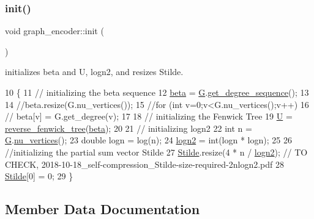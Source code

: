 \subsubsection{\texorpdfstring{init()}{init()}}
{\footnotesize\ttfamily void graph\+\_\+encoder\+::init (\begin{DoxyParamCaption}{ }\end{DoxyParamCaption})}



initializes beta and U, logn2, and resizes Stilde. 


\begin{DoxyCode}
10 \{
11   \textcolor{comment}{// initializing the beta sequence}
12   \hyperlink{classgraph__encoder_a40880adecfd63fb86e94b4b0fc3f6bc2}{beta} = \hyperlink{classgraph__encoder_a56d8ab1a423e192c6f80514ff5e5cfec}{G}.\hyperlink{classgraph_afdca627df7fb93a7d1d8a547f616e948}{get\_degree\_sequence}();
13 
14   \textcolor{comment}{//beta.resize(G.nu\_vertices());}
15   \textcolor{comment}{//for (int v=0;v<G.nu\_vertices();v++)}
16   \textcolor{comment}{//  beta[v] = G.get\_degree(v);  }
17 
18   \textcolor{comment}{// initializing the Fenwick Tree}
19   \hyperlink{classgraph__encoder_a3314c40920f2ee132958a6b0ce7e7995}{U} = \hyperlink{classreverse__fenwick__tree}{reverse\_fenwick\_tree}(\hyperlink{classgraph__encoder_a40880adecfd63fb86e94b4b0fc3f6bc2}{beta});
20 
21   \textcolor{comment}{// initializing logn2}
22   \textcolor{keywordtype}{int} n = \hyperlink{classgraph__encoder_a56d8ab1a423e192c6f80514ff5e5cfec}{G}.\hyperlink{classgraph_a70a6e0e4e0a874ab122405abd38f83cd}{nu\_vertices}();
23   \textcolor{keywordtype}{double} logn = log(n);
24   \hyperlink{classgraph__encoder_a27fde3a95a280304877b1e37fc4d8553}{logn2} = int(logn * logn);
25 
26   \textcolor{comment}{//initializing the partial sum vector Stilde}
27   \hyperlink{classgraph__encoder_a342688a3fdee511b7fae3f155cfb10cf}{Stilde}.resize(4 * n / \hyperlink{classgraph__encoder_a27fde3a95a280304877b1e37fc4d8553}{logn2}); \textcolor{comment}{// TO CHECK,
       2018-10-18\_self-compression\_Stilde-size-required-2nlogn2.pdf}
28   \hyperlink{classgraph__encoder_a342688a3fdee511b7fae3f155cfb10cf}{Stilde}[0] = 0;
29 \}
\end{DoxyCode}


\subsection{Member Data Documentation}
\mbox{\label{classgraph__encoder_a40880adecfd63fb86e94b4b0fc3f6bc2}} 
